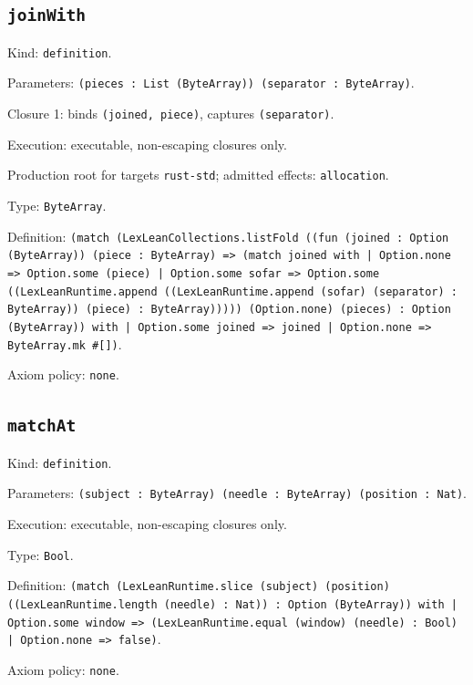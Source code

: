\documentclass[11pt]{article}
\begin{document}
\subsection*{\texttt{joinWith}}
\noindent Kind: \texttt{definition}.\par
\noindent Parameters: \texttt{(pieces : List (ByteArray)) (separator : ByteArray)}.\par
\noindent Closure 1: binds \texttt{(joined, piece)}, captures \texttt{(separator)}.\par
\noindent Execution: executable, non-escaping closures only.\par
\noindent Production root for targets \texttt{rust-std}; admitted effects: \texttt{allocation}.\par
\noindent Type: \texttt{ByteArray}.\par
\noindent Definition: \texttt{(match (LexLeanCollections.listFold ((fun (joined : Option (ByteArray)) (piece : ByteArray) => (match joined with | Option.none => Option.some (piece) | Option.some sofar => Option.some ((LexLeanRuntime.append ((LexLeanRuntime.append (sofar) (separator) : ByteArray)) (piece) : ByteArray))))) (Option.none) (pieces) : Option (ByteArray)) with | Option.some joined => joined | Option.none => ByteArray.mk \#[])}.\par
\noindent Axiom policy: \texttt{none}.\par
\subsection*{\texttt{matchAt}}
\noindent Kind: \texttt{definition}.\par
\noindent Parameters: \texttt{(subject : ByteArray) (needle : ByteArray) (position : Nat)}.\par
\noindent Execution: executable, non-escaping closures only.\par
\noindent Type: \texttt{Bool}.\par
\noindent Definition: \texttt{(match (LexLeanRuntime.slice (subject) (position) ((LexLeanRuntime.length (needle) : Nat)) : Option (ByteArray)) with | Option.some window => (LexLeanRuntime.equal (window) (needle) : Bool) | Option.none => false)}.\par
\noindent Axiom policy: \texttt{none}.\par
\end{document}
